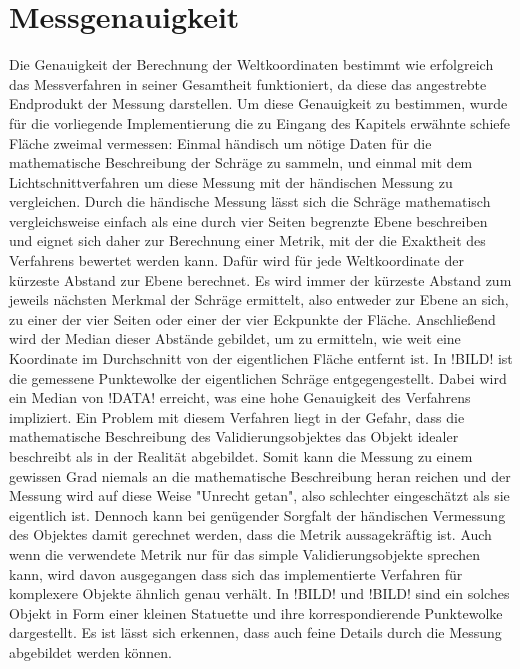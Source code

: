 \section{Messgenauigkeit}
Die Genauigkeit der Berechnung der Weltkoordinaten bestimmt wie erfolgreich das Messverfahren in seiner Gesamtheit funktioniert, da diese das angestrebte Endprodukt der Messung darstellen. Um diese Genauigkeit zu bestimmen, wurde für die vorliegende Implementierung die zu Eingang des Kapitels erwähnte schiefe Fläche zweimal vermessen: Einmal händisch um nötige Daten für die mathematische Beschreibung der Schräge zu sammeln, und einmal mit dem Lichtschnittverfahren um diese Messung mit der händischen Messung zu vergleichen. Durch die händische Messung lässt sich die Schräge mathematisch vergleichsweise einfach als eine durch vier Seiten begrenzte Ebene beschreiben und eignet sich daher zur Berechnung einer Metrik, mit der die Exaktheit des Verfahrens bewertet werden kann. Dafür wird für jede Weltkoordinate der kürzeste Abstand zur Ebene berechnet. Es wird immer der kürzeste Abstand zum jeweils nächsten Merkmal der Schräge ermittelt, also entweder zur Ebene an sich, zu einer der vier Seiten oder einer der vier Eckpunkte der Fläche. Anschließend wird der Median dieser Abstände gebildet, um zu ermitteln, wie weit eine Koordinate im Durchschnitt von der eigentlichen Fläche entfernt ist. In !BILD! ist die gemessene Punktewolke der eigentlichen Schräge entgegengestellt. Dabei wird ein Median von !DATA! erreicht, was eine hohe Genauigkeit des Verfahrens impliziert. \linebreak
Ein Problem mit diesem Verfahren liegt in der Gefahr, dass die mathematische Beschreibung des Validierungsobjektes das Objekt idealer beschreibt als in der Realität abgebildet. Somit kann die Messung zu einem gewissen Grad niemals an die mathematische Beschreibung heran reichen und der Messung wird auf diese Weise "Unrecht getan", also schlechter eingeschätzt als sie eigentlich ist. Dennoch kann bei genügender Sorgfalt der händischen Vermessung des Objektes damit gerechnet werden, dass die Metrik aussagekräftig ist. Auch wenn die verwendete Metrik nur für das simple Validierungsobjekte sprechen kann, wird davon ausgegangen dass sich das implementierte Verfahren für komplexere Objekte ähnlich genau verhält. In !BILD! und !BILD! sind ein solches Objekt in Form einer kleinen Statuette und ihre korrespondierende Punktewolke dargestellt. Es ist lässt sich erkennen, dass auch feine Details durch die Messung abgebildet werden können.